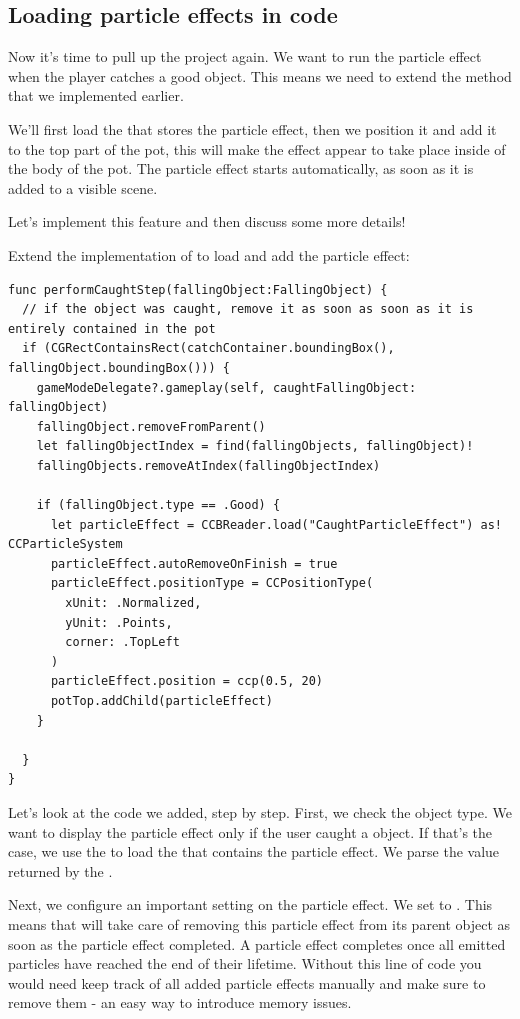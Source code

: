 \subsection{Loading particle effects in code}
Now it's time to pull up the \xcode{} project again. We want to run the particle
effect when the player catches a good object. This means we need to extend the
 method that we implemented earlier.

We'll first load the \ccbfile{} that stores the particle effect, then we
position it and add it to the top part of the pot, this will make the effect
appear to take place inside of the body of the pot. The particle effect starts
automatically, as soon as it is added to a visible scene.

Let's implement this feature and then discuss some more details!

\begin{leftbar}
Extend the implementation of  to
load and add the particle effect:
\begin{lstlisting}
func performCaughtStep(fallingObject:FallingObject) {
  // if the object was caught, remove it as soon as soon as it is entirely contained in the pot
  if (CGRectContainsRect(catchContainer.boundingBox(), fallingObject.boundingBox())) {
    gameModeDelegate?.gameplay(self, caughtFallingObject: fallingObject)
    fallingObject.removeFromParent()
    let fallingObjectIndex = find(fallingObjects, fallingObject)!
    fallingObjects.removeAtIndex(fallingObjectIndex)
    
    if (fallingObject.type == .Good) {      
      let particleEffect = CCBReader.load("CaughtParticleEffect") as! CCParticleSystem
      particleEffect.autoRemoveOnFinish = true
      particleEffect.positionType = CCPositionType(
        xUnit: .Normalized,
        yUnit: .Points,
        corner: .TopLeft
      )
      particleEffect.position = ccp(0.5, 20)
      potTop.addChild(particleEffect) 
    }
    
  }
}
\end{lstlisting}
\end{leftbar}
Let's look at the code we added, step by step. First, we check the object type.
We want to display the particle effect only if the user caught a
 object. If that's the case, we use the 
to load the \ccbfile{} that contains the particle effect. We parse the value
returned by the .

Next, we configure an important setting on the particle effect. We set
 to . This means that \cocos{}
will take care of removing this particle effect from its parent object as soon
as the particle effect completed. A particle effect completes once all emitted
particles have reached the end of their lifetime. Without this line of code you
would need keep track of all added particle effects manually and make sure to
remove them - an easy way to introduce memory issues.

